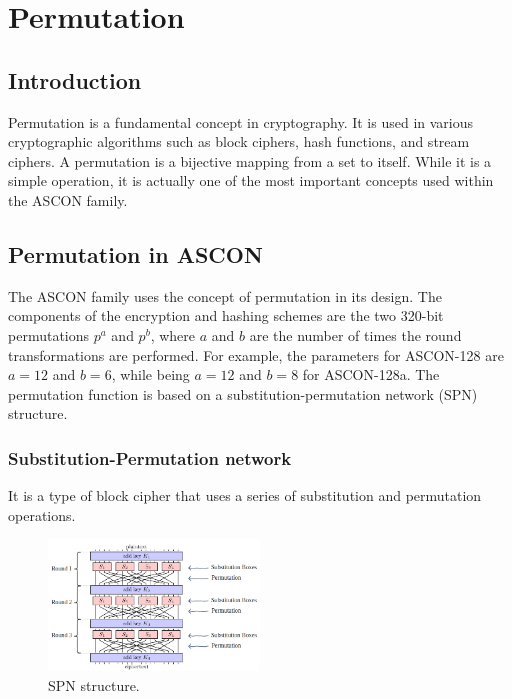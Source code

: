 
\section{Permutation}
\subsection{Introduction}

Permutation is a fundamental concept in cryptography. It is used in various cryptographic algorithms such as block ciphers, hash functions, and stream ciphers. A permutation is a bijective mapping from a set to itself. While it is a simple operation, it is actually one of the most important concepts used within the ASCON family. \par


\subsection{Permutation in ASCON}
The ASCON family uses the concept of permutation in its design. The components of the encryption and hashing schemes are the two 320-bit permutations $p^a$ and $p^b$, where $a$ and $b$ are the number of times the round transformations are performed. For example, the parameters for ASCON-128 are $a = 12$ and $b = 6$, while being $a = 12$ and $b = 8$ for ASCON-128a. The permutation function is based on a substitution-permutation network (SPN) structure. \cite{DBLP:journals/joc/DobraunigEMS21, ascon_specification} \par

\subsubsection{Substitution-Permutation network}

It is a type of block cipher that uses a series of substitution and permutation operations.

\begin{figure}[htbp]
  \centering
  \includegraphics[width=0.5\textwidth]{images/spn.png}
  \caption{SPN structure. \cite{DBLP:journals/joc/DobraunigEMS21}}
  \label{fig:spn}
\end{figure}

